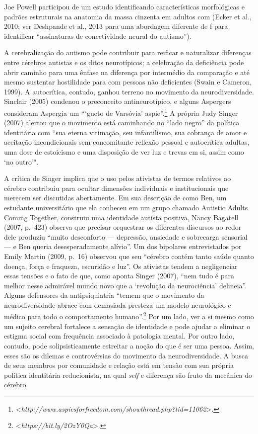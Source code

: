 Joe Powell participou de um estudo identificando características
morfológicas e padrões estruturais na anatomia da massa cinzenta em
adultos com  (Ecker et al., 2010; ver Deshpande et al., 2013 para uma
abordagem diferente de f para identificar ``assinaturas de
conectividade neural do autismo'').

A cerebralização do autismo pode contribuir para reificar e naturalizar
diferenças entre cérebros autistas e os ditos neurotípicos; a celebração
da deficiência pode abrir caminho para uma ênfase na diferença por
intermédio da comparação e até mesmo sustentar hostilidade para com
pessoas não deficientes (Swain e Cameron, 1999). A autocrítica, contudo,
ganhou terreno no movimento da neurodiversidade. Sinclair (2005)
condenou o preconceito antineurotípico, e alguns Aspergers consideram
Aspergia um ```gueto de Varsóvia' aspie''.\footnote[31]{\textless{}\emph{http://www.aspiesforfreedom.com/showthread.php?tid=11062}\textgreater{}.} A própria
Judy Singer (2007) alertou que o movimento está caminhando no ``lado
negro'' da política identitária com ``sua eterna vitimação, seu
infantilismo, sua cobrança de amor e aceitação incondicionais sem
concomitante reflexão pessoal e autocrítica adultas, uma dose de
estoicismo e uma disposição de ver luz e trevas em si, assim como `no
outro'".

A crítica de Singer implica que o uso pelos ativistas de termos
relativos ao cérebro contribuiu para ocultar dimensões individuais e
institucionais que merecem ser discutidas abertamente. Em sua descrição
de como Ben, um estudante universitário que ela conheceu em um grupo
chamado Autistic Adults Coming Together, construiu uma identidade
autista positiva, Nancy Bagatell (2007, p.~423) observa que precisar
orquestrar os diferentes discursos ao redor dele produziu ``muito
desconforto --- depressão, ansiedade e sobrecarga sensorial --- e Ben
queria desesperadamente alívio''. Um dos bipolares entrevistados por
Emily Martin (2009, p.~16) observou que seu ``cérebro contém tanto saúde
quanto doença, força e fraqueza, escuridão e luz''. Os ativistas tendem
a negligenciar essas tensões e o fato de que, como aponta Singer (2007),
``nem tudo é para melhor nesse admirável mundo novo que a `revolução da
neurociência' delineia''. Alguns defensores da antipsiquiatria ``temem
que o movimento da neurodiversidade abrace com demasiada presteza um
modelo neurológico e médico para todo o comportamento
humano''.\footnote[32]{\textless{}\emph{https://bit.ly/2OzY0Qa}\textgreater{}.} Por um lado, ver a si mesmo como um
sujeito cerebral fortalece a sensação de identidade e pode ajudar a
eliminar o estigma social com frequência associado à patologia mental.
Por outro lado, contudo, pode solipsisticamente estreitar a noção do que
é ser uma pessoa. Assim, esses são os dilemas e controvérsias do
movimento da neurodiversidade. A busca de seus membros por comunidade e
relação está em tensão com sua própria política identitária
reducionista, na qual \emph{self} e diferença são fruto da mecânica do cérebro.

